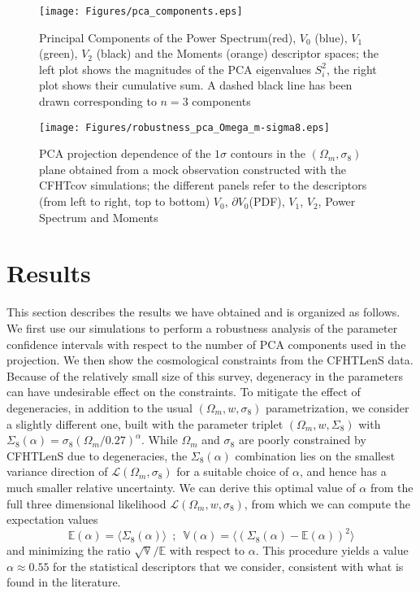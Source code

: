 \documentclass[reprint,aps,prd,superscriptaddress,showkeys,showpacs]{revtex4-1}
\begin{document}


%
\begin{figure*}
\texttt{[image: Figures/pca\_components.eps]}
\caption{Principal Components of the Power Spectrum(red), $V_0$ (blue), $V_1$ (green), $V_2$ (black) and the Moments (orange) descriptor spaces; the left plot shows the magnitudes of the PCA eigenvalues $S_i^2$, the right plot shows their cumulative sum. A dashed black line has been drawn corresponding to $n=3$ components}
\label{pcafig}
\end{figure*}
%
%
\begin{figure*}
\texttt{[image: Figures/robustness\_pca\_Omega\_m-sigma8.eps]}
\caption{PCA projection dependence of the $1\sigma$ contours in the $(\Omega_m,\sigma_8)$ plane obtained from a mock observation constructed with the CFHTcov simulations; the different panels refer to the descriptors (from left to right, top to bottom) $V_0$, $\partial V_0$(PDF), $V_1$, $V_2$, Power Spectrum and Moments}
\label{robustnessfig}
\end{figure*}
%

\section{Results}
\label{results}
This section describes the results we have obtained and is organized as follows. We first use our simulations to perform a robustness analysis of the parameter confidence intervals with respect to the number of PCA components used in the projection. We then show the cosmological constraints from the CFHTLenS data. Because of the relatively small size of this survey, degeneracy in the parameters can have undesirable effect on the constraints. To mitigate the effect of degeneracies, in addition to the usual $(\Omega_m,w,\sigma_8)$ parametrization, we consider a slightly different one, built with the parameter triplet $(\Omega_m,w,\Sigma_8)$ with $\Sigma_8(\alpha)=\sigma_8(\Omega_m/0.27)^\alpha$. While $\Omega_m$ and $\sigma_8$ are poorly constrained by CFHTLenS due to degeneracies, the $\Sigma_8(\alpha)$ combination lies on the smallest variance direction of $\mathcal{L}(\Omega_m,\sigma_8)$ for a suitable choice of $\alpha$, and hence has a much smaller relative uncertainty. We can derive this optimal value of $\alpha$ from the full three dimensional likelihood $\mathcal{L}(\Omega_m,w,\sigma_8)$, from which we can compute the expectation values
\begin{equation}
\mathds{E}(\alpha) = \langle\Sigma_8(\alpha)\rangle \,\,\, ; \,\,\, \mathds{V}(\alpha) = \langle(\Sigma_8(\alpha)-\mathds{E}(\alpha))^2\rangle
\end{equation}
%
and minimizing the ratio $\sqrt{\mathds{V}}/\mathds{E}$ with respect to $\alpha$. This procedure yields a value $\alpha\approx0.55$ for the statistical descriptors that we consider, consistent  with what is found in the literature. 
\end{document}
